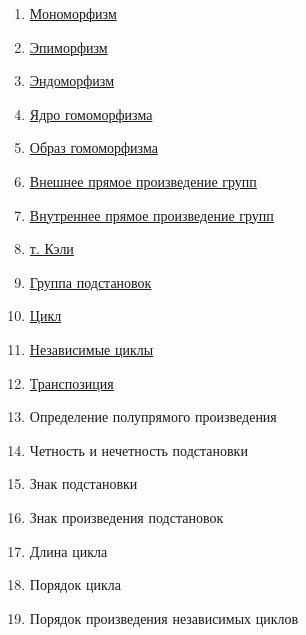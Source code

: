 \documentclass[12pt]{article}
\begin{document}
\begin{enumerate}
					\item \hyperlink{indef:morfizm}{Мономорфизм}
					\item \hyperlink{indef:morfizm}{Эпиморфизм}
					\item \hyperlink{indef:morfizm}{Эндоморфизм} 
					\item \hyperlink{indef:morfizm}{Ядро гомоморфизма}
					\item \hyperlink{indef:morfizm}{Образ гомоморфизма}
					\item \hyperlink{def:comp}{Внешнее прямое произведение групп}
					\item \hyperlink{def:in_comp}{Внутреннее прямое произведение групп}
					\item \hyperlink{th:keli}{т. Кэли}				
					\item \hyperlink{el}{Группа подстановок}
					\item \hyperlink{def:while}{Цикл}
					\item \hyperlink{def:while}{Независимые циклы}
					\item \hyperlink{def:while}{Транспозиция}
					\item Определение полупрямого произведения
					\item Четность и нечетность подстановки
					\item Знак подстановки
					\item Знак произведения подстановок 
					\item Длина цикла
					\item Порядок цикла
					\item Порядок произведения независимых циклов
				\end{enumerate}
		
		
		
		
		
		
		
		
		
\end{document}
